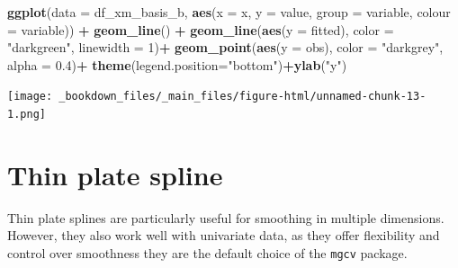 \documentclass[
]{book}
\newenvironment{Shaded}{\begin{snugshade}}{\end{snugshade}}
\newcommand{\AttributeTok}[1]{\textcolor[rgb]{0.13,0.29,0.53}{#1}}
\newcommand{\CommentTok}[1]{\textcolor[rgb]{0.56,0.35,0.01}{\textit{#1}}}
\newcommand{\DecValTok}[1]{\textcolor[rgb]{0.00,0.00,0.81}{#1}}
\newcommand{\FloatTok}[1]{\textcolor[rgb]{0.00,0.00,0.81}{#1}}
\newcommand{\FunctionTok}[1]{\textcolor[rgb]{0.13,0.29,0.53}{\textbf{#1}}}
\newcommand{\NormalTok}[1]{#1}
\newcommand{\OtherTok}[1]{\textcolor[rgb]{0.56,0.35,0.01}{#1}}
\newcommand{\SpecialCharTok}[1]{\textcolor[rgb]{0.81,0.36,0.00}{\textbf{#1}}}
\newcommand{\StringTok}[1]{\textcolor[rgb]{0.31,0.60,0.02}{#1}}
\begin{document}
\begin{Shaded}
\begin{Highlighting}[]
\FunctionTok{ggplot}\NormalTok{(}\AttributeTok{data =}\NormalTok{ df\_xm\_basis\_b, }\FunctionTok{aes}\NormalTok{(}\AttributeTok{x =}\NormalTok{ x, }\AttributeTok{y =}\NormalTok{ value, }\AttributeTok{group =}\NormalTok{ variable, }\AttributeTok{colour =}\NormalTok{ variable)) }\SpecialCharTok{+}
  \FunctionTok{geom\_line}\NormalTok{() }\SpecialCharTok{+} \FunctionTok{geom\_line}\NormalTok{(}\FunctionTok{aes}\NormalTok{(}\AttributeTok{y =}\NormalTok{ fitted), }\AttributeTok{color =} \StringTok{"darkgreen"}\NormalTok{, }\AttributeTok{linewidth =} \DecValTok{1}\NormalTok{)}\SpecialCharTok{+}
  \FunctionTok{geom\_point}\NormalTok{(}\FunctionTok{aes}\NormalTok{(}\AttributeTok{y =}\NormalTok{ obs), }\AttributeTok{color =} \StringTok{"darkgrey"}\NormalTok{, }\AttributeTok{alpha =} \FloatTok{0.4}\NormalTok{)}\SpecialCharTok{+} \FunctionTok{theme}\NormalTok{(}\AttributeTok{legend.position=}\StringTok{"bottom"}\NormalTok{)}\SpecialCharTok{+}\FunctionTok{ylab}\NormalTok{(}\StringTok{"y"}\NormalTok{)}
\end{Highlighting}
\end{Shaded}

\texttt{[image: \_bookdown\_files/\_main\_files/figure-html/unnamed-chunk-13-1.png]}

\hypertarget{thin-plate-spline}{%
\section{Thin plate spline}\label{thin-plate-spline}}

Thin plate splines are particularly useful for smoothing in multiple dimensions. However, they also work well with univariate data, as they offer flexibility and control over smoothness they are the default choice of the \texttt{mgcv} package.

\begin{Shaded}
\end{Shaded}
\end{document}

